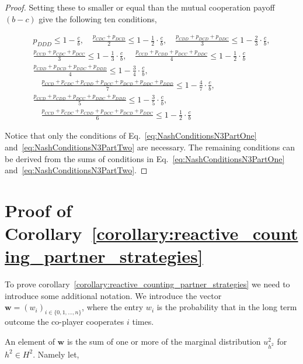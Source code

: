 \documentclass{article}
\theoremstyle{definition}
\begin{document}
\begin{proof}
Setting these to smaller or equal than the mutual cooperation payoff $(b - c)$
give the following ten conditions,

\begin{align}
  p_{DDD} \leq 1 \!- \!\frac{c}{b},
  \quad \frac{p_{CDC} + p_{DCD}}{2} \leq 1 - \frac{1}{2} \cdot \frac{c}{b}, 
  \quad \frac{p_{CDD} + p_{DCD} + p_{DDC}}{3} \leq 1 - \frac{2}{3} \cdot \frac{c}{b}, \label{eq:NashConditionsN3PartOne} \\[.5em]
  \frac{p_{CCD} + p_{CDC} + p_{DCC}}{3} \leq 1 - \frac{1}{3} \cdot \frac{c}{b},
  \quad \frac{p_{CCD} + p_{CDD} + p_{DCC} + p_{DDC}}{4} \leq 1 - \frac{1}{2}  \cdot \frac{c}{b} \label{eq:NashConditionsN3PartTwo} \\[.5em]
  \frac{p_{CDD} + p_{DCD} + p_{DDC} + p_{DDD}}{4} \leq 1 - \frac{3}{4} \cdot \frac{c}{b}, \\[.5em]
  \quad \frac{p_{CCD} + p_{CDC} + p_{CDD} + p_{DCC} + p_{DCD} + p_{DDC} + p_{DDD}}{7} \leq 1 - \frac{4}{7} \cdot \frac{c}{b}, \\[.5em]
  \frac{p_{CCD} + p_{CDD} + p_{DCC} + p_{DDC} + p_{DDD}}{5} \leq 1 - \frac{3}{5} \cdot \frac{c}{b}, \\[.5em]
  \quad \frac{p_{CCD} + p_{CDC} + p_{CDD} + p_{DCC} + p_{DCD} + p_{DDC}}{6} \leq 1 - \frac{1}{2} \cdot \frac{c}{b}
\end{align}

Notice that only the conditions of Eq.~\eqref{eq:NashConditionsN3PartOne}
and~\eqref{eq:NashConditionsN3PartTwo} are necessary. The remaining conditions can
be derived from the sums of conditions in Eq.~\eqref{eq:NashConditionsN3PartOne}
and~\eqref{eq:NashConditionsN3PartTwo}.
\end{proof}

\section{Proof of Corollary~\ref{corollary:reactive_counting_partner_strategies}}

To prove corollary~\ref{corollary:reactive_counting_partner_strategies} we need
to introduce some additional notation. We introduce the vector $\mathbf{w} =
(w_i)_{i \in \{0, 1, \dots, n\}}$, where the entry $w_i$ is the probability that
in the long term outcome the co-player cooperates $i$ times.

An element of $\mathbf{w}$ is the sum of one or more of the marginal distribution
$u^2_{h^2}$ for $h^2 \in H^2$. Namely let,
\end{document}
